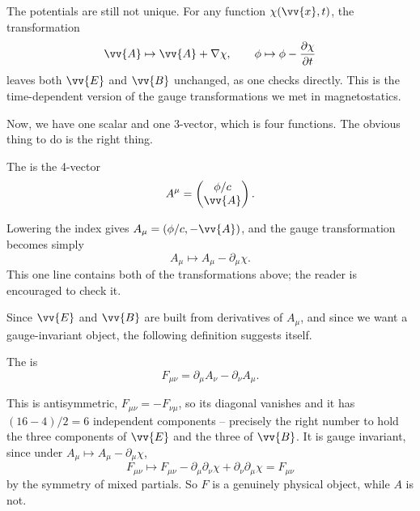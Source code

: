 The potentials are still not unique. For any function $\chi(\vv{x},t)$, the transformation
$$
\vv{A}\mapsto \vv{A}+\nabla\chi, \qquad \phi \mapsto \phi - \frac{\partial\chi}{\partial t}
$$
leaves both $\vv{E}$ and $\vv{B}$ unchanged, as one checks directly. This is the time-dependent version of the gauge transformations we met in magnetostatics.

Now, we have one scalar and one 3-vector, which is four functions. The obvious thing to do is the right thing.

\begin{definition}[4-potential]
	The  is the 4-vector
	$$
	A^\mu = \begin{pmatrix} \phi/c\\ \vv{A}\end{pmatrix}.
	$$
\end{definition}

Lowering the index gives $A_\mu = (\phi/c, -\vv{A})$, and the gauge transformation becomes simply
$$
A_\mu \mapsto A_\mu - \partial_\mu \chi.
$$
This one line contains both of the transformations above; the reader is encouraged to check it.

Since $\vv{E}$ and $\vv{B}$ are built from derivatives of $A_\mu$, and since we want a gauge-invariant object, the following definition suggests itself.

\begin{definition}
	The  is
	$$
	F_{\mu\nu} = \partial_\mu A_\nu - \partial_\nu A_\mu.
	$$
\end{definition}

This is antisymmetric, $F_{\mu\nu} = -F_{\nu\mu}$, so its diagonal vanishes and it has $(16-4)/2 = 6$ independent components -- precisely the right number to hold the three components of $\vv{E}$ and the three of $\vv{B}$. It is gauge invariant, since under $A_\mu\mapsto A_\mu - \partial_\mu\chi$,
$$
F_{\mu\nu}\mapsto F_{\mu\nu} - \partial_\mu\partial_\nu \chi + \partial_\nu\partial_\mu\chi = F_{\mu\nu}
$$
by the symmetry of mixed partials. So $F$ is a genuinely physical object, while $A$ is not.

